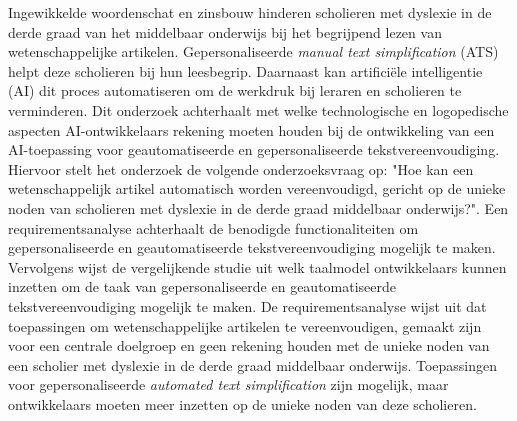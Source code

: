 Ingewikkelde woordenschat en zinsbouw hinderen scholieren met dyslexie in de derde graad van het middelbaar onderwijs bij het begrijpend lezen van wetenschappelijke artikelen. Gepersonaliseerde \textit{manual text simplification} (ATS) helpt deze scholieren bij hun leesbegrip. Daarnaast kan artificiële intelligentie (AI) dit proces automatiseren om de werkdruk bij leraren en scholieren te verminderen. Dit onderzoek achterhaalt met welke technologische en logopedische aspecten AI-ontwikkelaars rekening moeten houden bij de ontwikkeling van een AI-toepassing voor geautomatiseerde en gepersonaliseerde tekstvereenvoudiging. Hiervoor stelt het onderzoek de volgende onderzoeksvraag op: "Hoe kan een wetenschappelijk artikel automatisch worden vereenvoudigd, gericht op de unieke noden van scholieren met dyslexie in de derde graad middelbaar onderwijs?". Een requirementsanalyse achterhaalt de benodigde functionaliteiten om gepersonaliseerde en geautomatiseerde tekstvereenvoudiging mogelijk te maken. Vervolgens wijst de vergelijkende studie uit welk taalmodel ontwikkelaars kunnen inzetten om de taak van gepersonaliseerde en geautomatiseerde tekstvereenvoudiging mogelijk te maken. De requirementsanalyse wijst uit dat toepassingen om wetenschappelijke artikelen te vereenvoudigen, gemaakt zijn voor een centrale doelgroep en geen rekening houden met de unieke noden van een scholier met dyslexie in de derde graad middelbaar onderwijs. Toepassingen voor gepersonaliseerde \textit{automated text simplification} zijn mogelijk, maar ontwikkelaars moeten meer inzetten op de unieke noden van deze scholieren.
